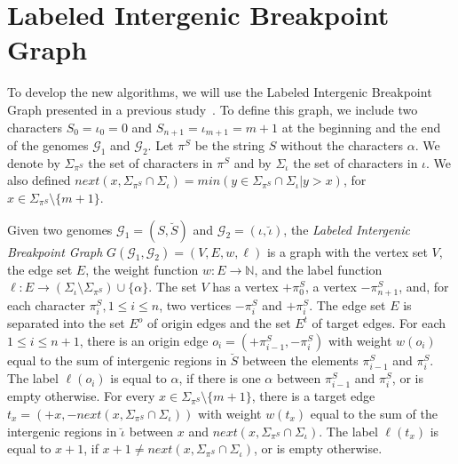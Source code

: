 \documentclass[12pt]{article}
\begin{document}
\section{Labeled Intergenic Breakpoint Graph}\label{sec:bg}

To develop the new algorithms, we will use the Labeled Intergenic Breakpoint Graph presented in a previous study~\cite{2021b-alexandrino-etal}. To define this graph, we include two characters $S_0 = \iota_0 = 0$ and $S_{n +1} = \iota_{m+1} = m+1$ at the beginning and the end of the genomes $\mathcal{G}_1$ and $\mathcal{G}_2$. Let $\pi^S$ be the string $S$ without the characters $\alpha$. We denote by $\Sigma_{\pi^S}$ the set of characters in $\pi^S$ and by $\Sigma_{\iota}$ the set of characters in $\iota$. We also defined $next(x,\Sigma_{\pi^S} \cap \Sigma_{\iota}) = min(y \in \Sigma_{\pi^S} \cap \Sigma_{\iota} | y > x)$, for $x \in \Sigma_{\pi^S} \setminus \{m+1\}$.

Given two genomes $\mathcal{G}_1 = (S,\breve{S})$ and $\mathcal{G}_2 = (\iota,\breve{\iota})$, the \emph{Labeled Intergenic Breakpoint Graph} $G(\mathcal{G}_1,\mathcal{G}_2) = (V,E,w,\ell)$ is a graph with the vertex set $V$, the edge set $E$, the weight function $w: E \to \mathbb{N}$, and the label function $\ell: E \to (\Sigma_{\iota} \setminus \Sigma_{\pi^S}) \cup \{\alpha\}$. The set $V$ has a vertex $+\pi^S_0$, a vertex $-\pi^S_{n+1}$, and, for each character $\pi^S_i, 1 \le i \le n$, two vertices $-\pi^S_i$ and $+\pi^S_i$. The edge set $E$ is separated into the set $E^o$ of origin edges and the set $E^t$ of target edges. For each $1 \le i \le n + 1$, there is an origin edge $o_i=(+\pi^S_{i-1},-\pi^S_i)$ with weight $w(o_i)$ equal to the sum of intergenic regions in $\breve{S}$ between the elements $\pi^S_{i-1}$ and $\pi^S_{i}$. The label $\ell(o_i)$ is equal to $\alpha$, if there is one $\alpha$ between $\pi^S_{i-1}$ and $\pi^S_{i}$, or is empty otherwise. For every $x \in \Sigma_{\pi^S} \setminus \{m+1\}$, there is a target edge $t_x = (+x,-next(x,\Sigma_{\pi^S} \cap \Sigma_{\iota}))$ with weight $w(t_x)$ equal to the sum of the intergenic regions in $\breve{\iota}$ between $x$ and $next(x,\Sigma_{\pi^S} \cap \Sigma_{\iota})$. The label $\ell(t_x)$ is equal to $x+1$, if $x+1 \ne next(x,\Sigma_{\pi^S} \cap \Sigma_{\iota})$, or is empty otherwise.
\end{document}
